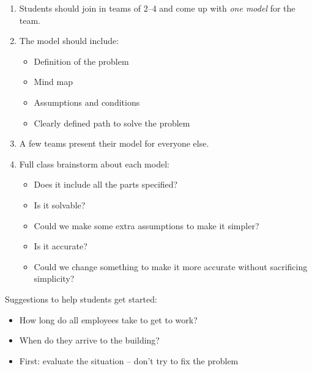 \begin{annotation}
\begin{goals}
	\begin{enumerate}[label=\textbf{\color{Cerulean}\arabic*.}]
		\item Students should join in teams of 2--4 and come up with \emph{one model} for the team.
		\item The model should include:
		\begin{itemize}
			\item Definition of the problem
			\item Mind map
			\item Assumptions and conditions
			\item Clearly defined path to solve the problem
		\end{itemize}
		\item A few teams present their model for everyone else.
		\item Full class brainstorm about each model:
		\begin{itemize}
			\item Does it include all the parts specified?
			\item Is it solvable? 
			\item Could we make some extra assumptions to make it simpler?
			\item Is it accurate?
			\item Could we change something to make it more accurate without sacrificing simplicity?
		\end{itemize}
	\end{enumerate}
\end{goals}	
\begin{notes}
Suggestions to help students get started:
\begin{itemize}
	\item How long do all employees take to get to work?
	\item When do they arrive to the building?
	\item First: evaluate the situation -- don't try to fix the problem
\end{itemize}	
\end{notes}
\end{annotation}


















